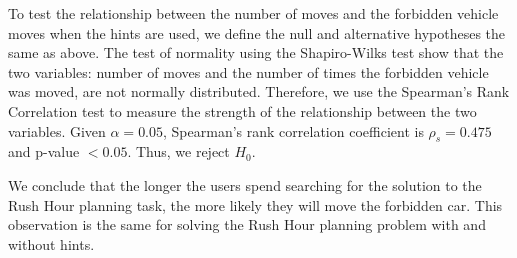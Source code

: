 To test the relationship between the number of moves and the forbidden vehicle moves when the hints are used, we define the null and alternative hypotheses the same as above.
The test of normality using the Shapiro-Wilks test show that the two variables: number of moves and the number of times the forbidden vehicle was moved, are not normally distributed.
Therefore, we use the Spearman's Rank Correlation test to measure the strength of the relationship between the two variables.
Given $\alpha=0.05$, Spearman's rank correlation coefficient is $\rho_s=0.475$ and p-value $<0.05$. 
Thus, we reject $H_0$.

We conclude that the longer the users spend searching for the solution to the Rush Hour planning task, the more likely they will move the forbidden car. 
This observation is the same for solving the Rush Hour planning problem with and without hints.


